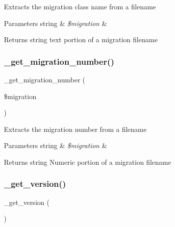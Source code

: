 Extracts the migration class name from a filename


\begin{DoxyParams}[1]{Parameters}
string & {\em \$migration} & \\
\hline
\end{DoxyParams}
\begin{DoxyReturn}{Returns}
string text portion of a migration filename 
\end{DoxyReturn}
\mbox{\label{class_c_i___migration_a79102ae684cc42b629c3cff885850c81}} 
\subsubsection{\texorpdfstring{\+\_\+get\+\_\+migration\+\_\+number()}{\_get\_migration\_number()}}
{\footnotesize\ttfamily \+\_\+get\+\_\+migration\+\_\+number (\begin{DoxyParamCaption}\item[{}]{\$migration }\end{DoxyParamCaption})\hspace{0.3cm}{\ttfamily [protected]}}

Extracts the migration number from a filename


\begin{DoxyParams}[1]{Parameters}
string & {\em \$migration} & \\
\hline
\end{DoxyParams}
\begin{DoxyReturn}{Returns}
string Numeric portion of a migration filename 
\end{DoxyReturn}
\mbox{\label{class_c_i___migration_a1de42592aaef750bc3782e873b1b6d5f}} 
\subsubsection{\texorpdfstring{\+\_\+get\+\_\+version()}{\_get\_version()}}
{\footnotesize\ttfamily \+\_\+get\+\_\+version (\begin{DoxyParamCaption}{ }\end{DoxyParamCaption})\hspace{0.3cm}{\ttfamily [protected]}}

